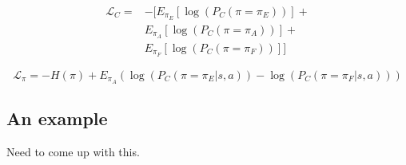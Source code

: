 \documentclass[letterpaper, 10 pt, conference]{ieeeconf}
\begin{document}
\begin{align}
    \mathcal{L}_C = & -\Big[ E_{\pi_E}[\log(P_C(\pi=\pi_E))] +\\ &E_{\pi_A}[\log(P_C(\pi=\pi_A))] +\\ &E_{\pi_F}[\log(P_C(\pi=\pi_F))]\Big]  
\end{align}

\begin{equation}
      \mathcal{L_\pi} = -H(\pi) + E_{\pi_A}(\log(P_C(\pi=\pi_E|s,a)) - \log(P_C(\pi=\pi_F|s,a))) 
\end{equation}

\subsection{An example}

Need to come up with this. 















\end{document}
